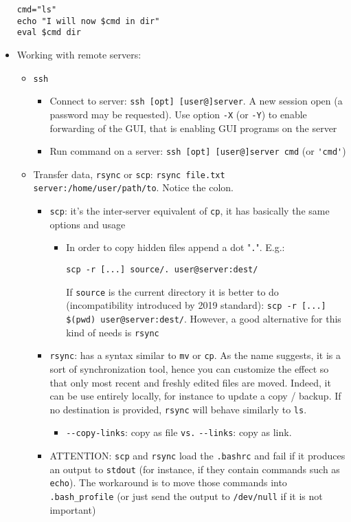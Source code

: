 \documentclass[a4paper,12pt,%
              final%
              ]{article}
\begin{document}
\begin{itemize}
\begin{verbatim}
cmd="ls"
echo "I will now $cmd in dir"
eval $cmd dir
\end{verbatim}
  \item Working with remote servers:
    \begin{itemize}
      \item \texttt{ssh}
        \begin{itemize}
          \item Connect to server: \verb|ssh [opt] [user@]server|. A new session open (a password may be requested). Use option \verb|-X| (or \verb|-Y|) to enable forwarding of the GUI, that is enabling GUI programs on the server
          \item Run command on a server: \verb|ssh [opt] [user@]server cmd| (or \verb|'cmd'|)
        \end{itemize}
      \item Transfer data, \texttt{rsync} or \texttt{scp}: \verb|rsync file.txt server:/home/user/path/to|. Notice the colon.
        \begin{itemize}
          \item \texttt{scp}: it's the inter-server equivalent of \texttt{cp}, it has basically the same options and usage
            \begin{itemize}
              \item In order to copy hidden files append a dot "\texttt{.}". E.g.:
\begin{verbatim}
scp -r [...] source/. user@server:dest/
\end{verbatim}
                If \texttt{source} is the current directory it is better to do (incompatibility introduced by 2019 standard): \verb|scp -r [...] $(pwd) user@server:dest/|. However, a good alternative for this kind of needs is \verb|rsync|
            \end{itemize}
          \item \texttt{rsync}: has a syntax similar to \texttt{mv} or \texttt{cp}. As the name suggests, it is a sort of synchronization tool, hence you can customize the effect so that only most recent and freshly edited files are moved. Indeed, it can be use entirely locally, for instance to update a copy / backup. If no destination is provided, \texttt{rsync} will behave similarly to \texttt{ls}.
            \begin{itemize}
              \item \verb|--copy-links|: copy as file \texttt{vs.} \verb|--links|: copy as link.
            \end{itemize}
          \item ATTENTION: \texttt{scp} and \texttt{rsync} load the \texttt{.bashrc} and fail if it produces an output to \texttt{stdout} (for instance, if they contain commands such as \texttt{echo}). The workaround is to move those commands into \texttt{.bash\_profile} (or just send the output to \verb|/dev/null| if it is not important)

\end{itemize}
\end{itemize}
\end{itemize}
\end{document}
